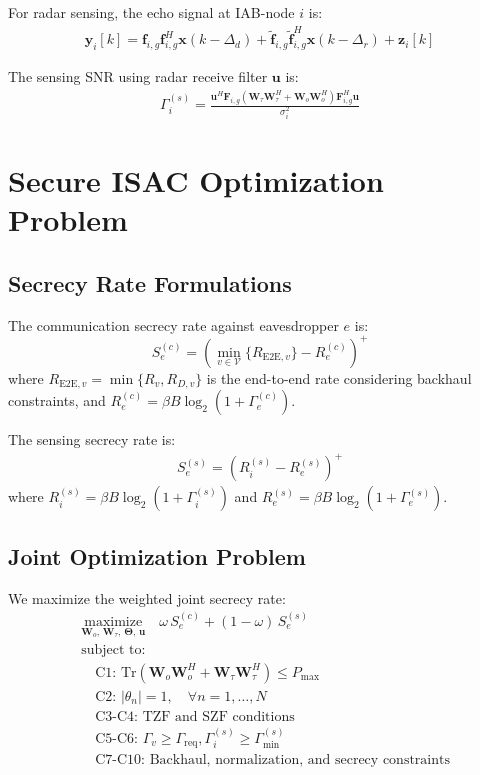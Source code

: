 \documentclass[conference]{IEEEtran}
\begin{document}
For radar sensing, the echo signal at IAB-node $i$ is:
\begin{align}
\mathbf{y}_{i}[k] = \mathbf{f}_{i,g}\mathbf{f}_{i,g}^H \mathbf{x}(k-\Delta_d) + \tilde{\mathbf{f}}_{i,g} \tilde{\mathbf{f}}_{i,g}^H\mathbf{x}(k-\Delta_r) + \mathbf{z}_i[k]
\end{align}

The sensing SNR using radar receive filter $\mathbf{u}$ is:
\begin{align}
\Gamma^{(s)}_i = \frac{\mathbf{u}^H\mathbf{F}_{i,g}(\mathbf{W}_{\tau}\mathbf{W}^H_{\tau}+\mathbf{W}_o\mathbf{W}^H_o) \mathbf{F}^H_{i,g}\mathbf{u}}{\sigma^2_i}
\end{align}

\section{Secure ISAC Optimization Problem}

\subsection{Secrecy Rate Formulations}

The communication secrecy rate against eavesdropper $e$ is:
\begin{equation}
S^{(c)}_e = \left(\min_{v\in\mathcal{V}}\{R_{\text{E2E},v}\} - R^{(c)}_e \right)^+
\end{equation}
where $R_{\text{E2E},v} = \min\{R_v, R_{D,v}\}$ is the end-to-end rate considering backhaul constraints, and $R^{(c)}_e= \beta B \log_2(1+\Gamma^{(c)}_e)$.

The sensing secrecy rate is:
\begin{align}
S^{(s)}_e = \left(R^{(s)}_i-R^{(s)}_e\right)^+
\end{align}
where $R^{(s)}_i = \beta B\log_2(1+\Gamma^{(s)}_i)$ and $R^{(s)}_e = \beta B \log_2(1+\Gamma^{(s)}_e)$.

\subsection{Joint Optimization Problem}

We maximize the weighted joint secrecy rate:
\begin{subequations}\label{eq:secrecy_opt}
\begin{align}
&\underset{\mathbf{W}_o,\,\mathbf{W}_\tau,\,\boldsymbol{\Theta},\,\mathbf{u}}{\text{maximize}} \quad \omega\,S_e^{(c)} + (1-\omega)\,S_e^{(s)} \\
&\text{subject to:} \nonumber \\
&\quad \text{C1: } \text{Tr}(\mathbf{W}_o \mathbf{W}_o^H + \mathbf{W}_\tau \mathbf{W}_\tau^H) \leq P_{\max} \\
&\quad \text{C2: } |\theta_n| = 1, \quad \forall n = 1,\ldots,N \\
&\quad \text{C3-C4: TZF and SZF conditions} \\
&\quad \text{C5-C6: } \Gamma_v \geq \Gamma_{\text{req}}, \Gamma_i^{(s)} \geq \Gamma_{\min}^{(s)} \\
&\quad \text{C7-C10: Backhaul, normalization, and secrecy constraints}
\end{align}
\end{subequations}
\end{document}
